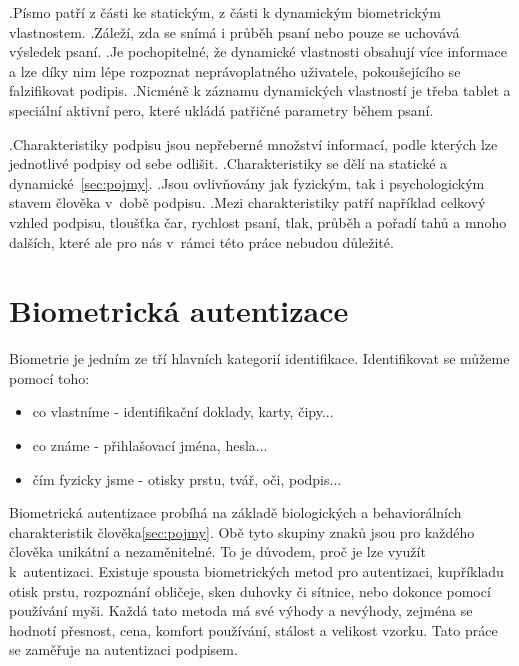 .Písmo patří z části ke statickým, z části k dynamickým biometrickým vlastnostem.                                                                                  %
.Záleží, zda se snímá i průběh psaní nebo pouze se uchovává výsledek psaní.                                                                                        %
.Je pochopitelné, že dynamické vlastnosti obsahují více informace a lze díky nim lépe rozpoznat neprávoplatného uživatele, pokoušejícího se falzifikovat podipis.  %
.Nicméně k záznamu dynamických vlastností je třeba tablet a speciální aktivní pero, které ukládá patřičné parametry během psaní.                                   %

.Charakteristiky podpisu jsou nepřeberné množství informací, podle kterých lze jednotlivé podpisy od sebe odlišit.
.Charakteristiky se dělí na statické a dynamické~\ref{sec:pojmy}. 
.Jsou ovlivňovány jak fyzickým, tak i psychologickým stavem člověka v~době podpisu.
.Mezi charakteristiky patří například celkový vzhled podpisu, tloušťka čar, rychlost psaní, tlak, průběh a pořadí tahů a mnoho dalších, které ale pro nás v~rámci této práce nebudou důležité. %

\section{Biometrická autentizace}
Biometrie je jedním ze tří hlavních kategorií identifikace.
Identifikovat se můžeme pomocí toho:

\begin{itemize}
  \item{co vlastníme - identifikační doklady, karty, čipy...}   %
  \item{co známe - přihlašovací jména, hesla...}                %
  \item{čím fyzicky jsme - otisky prstu, tvář, oči, podpis...}  %
\end{itemize}                                                   %



Biometrická autentizace probíhá na základě biologických a behaviorálních charakteristik člověka\ref{sec:pojmy}. 
Obě tyto skupiny znaků jsou pro každého člověka unikátní a nezaměnitelné. To je důvodem, proč je lze využít k~autentizaci.
Existuje spousta biometrických metod pro autentizaci, kupříkladu otisk prstu, rozpoznání obličeje, sken duhovky či sítnice, nebo dokonce pomocí používání myši. 
Každá tato metoda má své výhody a nevýhody, zejména se hodnotí přesnost, cena, komfort používání, stálost a velikost vzorku. %
Tato práce se zaměřuje na autentizaci podpisem.

